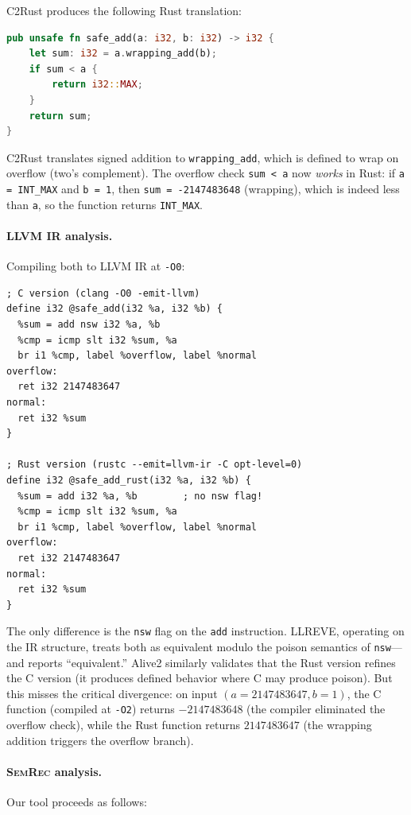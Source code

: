 \documentclass[11pt]{article}
\begin{document}
C2Rust produces the following Rust translation:
\begin{lstlisting}[language=Rust, caption={C2Rust output: \texttt{safe\_add}}, label={lst:rust-safe-add}]
pub unsafe fn safe_add(a: i32, b: i32) -> i32 {
    let sum: i32 = a.wrapping_add(b);
    if sum < a {
        return i32::MAX;
    }
    return sum;
}
\end{lstlisting}

C2Rust translates signed addition to \texttt{wrapping\_add}, which is defined to wrap on overflow (two's complement).
The overflow check \texttt{sum < a} now \emph{works} in Rust: if \texttt{a = INT\_MAX} and \texttt{b = 1}, then \texttt{sum = -2147483648} (wrapping), which is indeed less than \texttt{a}, so the function returns \texttt{INT\_MAX}.

\paragraph{LLVM IR analysis.}
Compiling both to LLVM IR at \texttt{-O0}:
\begin{lstlisting}[language=SMT, caption={LLVM IR for both functions (simplified)}, label={lst:ir-safe-add}]
; C version (clang -O0 -emit-llvm)
define i32 @safe_add(i32 %a, i32 %b) {
  %sum = add nsw i32 %a, %b
  %cmp = icmp slt i32 %sum, %a
  br i1 %cmp, label %overflow, label %normal
overflow:
  ret i32 2147483647
normal:
  ret i32 %sum
}

; Rust version (rustc --emit=llvm-ir -C opt-level=0)
define i32 @safe_add_rust(i32 %a, i32 %b) {
  %sum = add i32 %a, %b        ; no nsw flag!
  %cmp = icmp slt i32 %sum, %a
  br i1 %cmp, label %overflow, label %normal
overflow:
  ret i32 2147483647
normal:
  ret i32 %sum
}
\end{lstlisting}

The only difference is the \texttt{nsw} flag on the \texttt{add} instruction.
LLREVE, operating on the IR structure, treats both as equivalent modulo the poison semantics of \texttt{nsw}---and reports ``equivalent.''
Alive2 similarly validates that the Rust version refines the C version (it produces defined behavior where C may produce poison).
But this misses the critical divergence: on input $(a = 2147483647, b = 1)$, the C function (compiled at \texttt{-O2}) returns $-2147483648$ (the compiler eliminated the overflow check), while the Rust function returns $2147483647$ (the wrapping addition triggers the overflow branch).

\paragraph{\textsc{SemRec} analysis.}
Our tool proceeds as follows:
\end{document}
